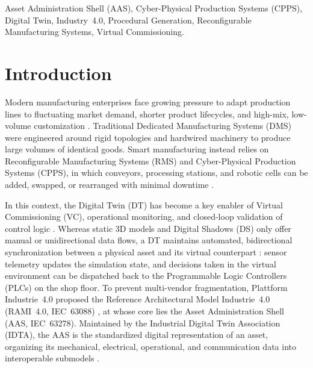 \documentclass{ieeeojies}
\begin{document}
\begin{keywords}
Asset Administration Shell (AAS), Cyber-Physical Production Systems (CPPS), Digital Twin, Industry~4.0, Procedural Generation, Reconfigurable Manufacturing Systems, Virtual Commissioning.
\end{keywords}

\titlepgskip=-15pt

\maketitle

\section{Introduction}
\label{sec:introduction}

Modern manufacturing enterprises face growing pressure to adapt production lines to fluctuating market demand, shorter product lifecycles, and high-mix, low-volume customization \cite{Khan2025,Rocha2024}. Traditional Dedicated Manufacturing Systems (DMS) were engineered around rigid topologies and hardwired machinery to produce large volumes of identical goods. Smart manufacturing instead relies on Reconfigurable Manufacturing Systems (RMS) and Cyber-Physical Production Systems (CPPS), in which conveyors, processing stations, and robotic cells can be added, swapped, or rearranged with minimal downtime \cite{Abdel-Aty2022,AshtariTalkhestani2019}.

In this context, the Digital Twin (DT) has become a key enabler of Virtual Commissioning (VC), operational monitoring, and closed-loop validation of control logic \cite{Tao2019,Striffler2023}. Whereas static 3D models and Digital Shadows (DS) only offer manual or unidirectional data flows, a DT maintains automated, bidirectional synchronization between a physical asset and its virtual counterpart \cite{Kritzinger2018,Pajpach2023}: sensor telemetry updates the simulation state, and decisions taken in the virtual environment can be dispatched back to the Programmable Logic Controllers (PLCs) on the shop floor. To prevent multi-vendor fragmentation, Plattform Industrie~4.0 proposed the Reference Architectural Model Industrie~4.0 (RAMI~4.0, IEC~63088) \cite{Pajpach2025}, at whose core lies the Asset Administration Shell (AAS, IEC~63278). Maintained by the Industrial Digital Twin Association (IDTA), the AAS is the standardized digital representation of an asset, organizing its mechanical, electrical, operational, and communication data into interoperable submodels \cite{Lu2025}.
\end{document}
